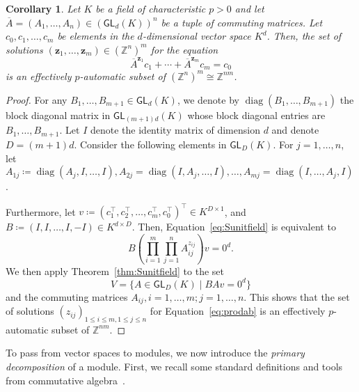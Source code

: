 \documentclass[a4paper,UKenglish,cleveref, autoref, thm-restate]{lipics-v2021}
\newcommand{\Z}{\mathbb{Z}}
\newcommand{\GL}{\mathsf{GL}}
\newcommand{\diag}{\operatorname{diag}}
\newcommand{\bz}{\boldsymbol{z}}
\newcommand{\oA}{\overline{A}}
\newtheorem{cor}[thrm]{Corollary}
\theoremstyle{definition}
\theoremstyle{definition}
\theoremstyle{definition}
\begin{document}
\begin{cor}\label{cor:MordellLang}
    Let $K$ be a field of characteristic $p > 0$ and let $\oA = (A_1, \ldots, A_n) \in \left(\GL_d(K)\right)^n$ be a tuple of commuting matrices.
    Let $c_0, c_1, \ldots, c_m$ be elements in the $d$-dimensional vector space $K^d$.
    Then, the set of solutions $(\bz_1, \ldots, \bz_m) \in \left(\Z^{n}\right)^{m}$ for the equation
    \begin{equation}\label{eq:Sunitfield}
        \oA^{\bz_1} c_1 + \cdots + \oA^{\bz_m} c_m = c_0
    \end{equation}
    is an effectively $p$-automatic subset of $\left(\Z^{n}\right)^{m} \cong \Z^{nm}$.
\end{cor}
\begin{proof}
For any $B_1, \ldots, B_{m+1} \in \GL_d(K)$, we denote by $\diag(B_1, \ldots, B_{m+1})$ the block diagonal matrix in $\GL_{(m+1)d}(K)$ whose block diagonal entries are $B_1, \ldots, B_{m+1}$.
    Let $I$ denote the identity matrix of dimension $d$ and denote $D = (m+1)d$.
    Consider the following elements in $\GL_{D}(K)$.
    For $j = 1, \ldots, n$, let $A_{1j} \coloneqq \diag(A_j, I, \ldots, I), A_{2j} = \diag(I, A_j, \ldots, I), \ldots, A_{mj} = \diag(I, \ldots, A_j, I)$.  
    
    Furthermore, let $v \coloneqq (c_1^{\top}, c_2^{\top}, \ldots, c_m^{\top}, c_0^{\top})^{\top} \in K^{D \times 1}$, and $B \coloneqq (I, I, \ldots, I, -I) \in K^{d \times D}$.
    Then, Equation~\eqref{eq:Sunitfield} is equivalent to
    \begin{equation}\label{eq:prodab}
    B\left( \prod_{i = 1}^m \prod_{j = 1}^n A_{ij}^{z_{ij}} \right)v = 0^d.
    \end{equation}
    We then apply Theorem~\ref{thm:Sunitfield} to the set
    \[
    V = \{A \in \GL_D(K) \mid BAv = 0^d\}
    \]
    and the commuting matrices $A_{ij}, i = 1, \ldots, m; j = 1, \ldots, n$.
    This shows that the set of solutions $(z_{ij})_{1 \leq i \leq m, 1 \leq j \leq n}$ for Equation~\eqref{eq:prodab} is an effectively $p$-automatic subset of $\Z^{nm}$.
\end{proof}

To pass from vector spaces to modules, we now introduce the \emph{primary decomposition} of a module.
First, we recall some standard definitions and tools from commutative algebra~\cite{eisenbud2013commutative}.
\end{document}
